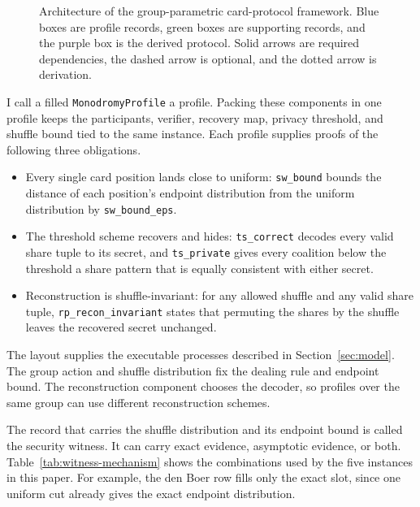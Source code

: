 \documentclass[runningheads]{llncs}
\newcommand{\coqin}[1]{\texttt{#1}}
\begin{document}
\begin{figure}[H]
{}
  \caption{Architecture of the group-parametric card-protocol framework.
  Blue boxes are profile records, green boxes are supporting records, and
  the purple box is the derived protocol. Solid arrows are required
  dependencies, the dashed arrow is optional, and the dotted arrow is
  derivation.}
  \label{fig:framework-architecture}
\end{figure}

I call a filled \coqin{MonodromyProfile} a profile. Packing these
components in one profile keeps the participants, verifier,
recovery map, privacy threshold, and shuffle bound tied to the same
instance. Each profile supplies proofs of the following three obligations.
\begin{itemize}
\item Every single card position lands close to uniform: \coqin{sw\_bound}
  bounds the distance of each position's endpoint distribution from the
  uniform distribution by \coqin{sw\_bound\_eps}.
\item The threshold scheme recovers and hides: \coqin{ts\_correct} decodes
  every valid share tuple to its secret, and \coqin{ts\_private} gives
  every coalition below the threshold a share pattern that is equally
  consistent with either secret.
\item Reconstruction is shuffle-invariant: for any allowed shuffle and any
  valid share tuple, \coqin{rp\_recon\_invariant} states that permuting the
  shares by the shuffle leaves the recovered secret unchanged.
\end{itemize}

The layout supplies the executable processes described in
Section~\ref{sec:model}. The group action and shuffle distribution fix the
dealing rule and endpoint bound. The reconstruction component chooses the
decoder, so profiles over the same group can use different reconstruction
schemes.

The record that carries the shuffle distribution and its endpoint bound
is called the security witness. It can carry exact evidence, asymptotic
evidence, or both. Table~\ref{tab:witness-mechanism} shows the combinations used by the
five instances in this paper. For example, the den Boer row fills only
the exact slot, since one uniform cut already gives the exact endpoint
distribution.
\end{document}
